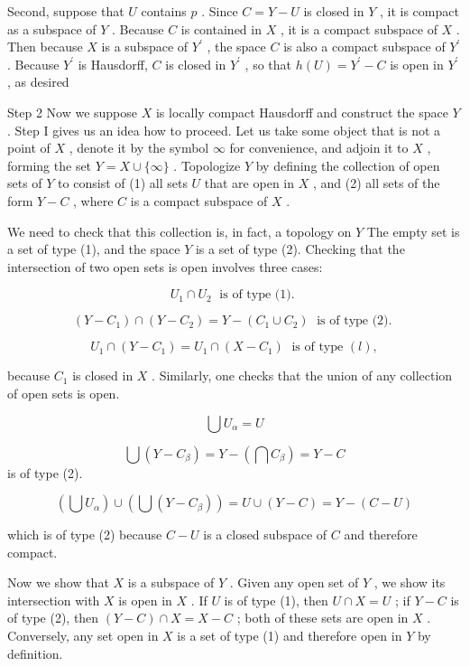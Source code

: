 Second, suppose that \(U\) contains \(p\) . Since \(C = Y - U\) is closed in \(Y\) , it is compact as a subspace of \(Y\) . Because \(C\) is contained in \(X\) , it is a compact subspace of \(X\) . Then because \(X\) is a subspace of \({Y}^{\prime }\) , the space \(C\) is also a compact subspace of \({Y}^{\prime }\) . Because \({Y}^{\prime }\) is Hausdorff, \(C\) is closed in \({Y}^{\prime }\) , so that \(h\left( U\right)  = {Y}^{\prime } - C\) is open in \({Y}^{\prime }\) , as desired

Step 2 Now we suppose \(X\) is locally compact Hausdorff and construct the space \(Y\) . Step I gives us an idea how to proceed. Let us take some object that is not a point of \(X\) , denote it by the symbol \(\infty\) for convenience, and adjoin it to \(X\) , forming the set \(Y = X \cup  \{ \infty \}\) . Topologize \(Y\) by defining the collection of open sets of \(Y\) to consist of (1) all sets \(U\) that are open in \(X\) , and (2) all sets of the form \(Y - C\) , where \(C\) is a compact subspace of \(X\) .

We need to check that this collection is, in fact, a topology on \(Y\) The empty set is a set of type (1), and the space \(Y\) is a set of type (2). Checking that the intersection of two open sets is open involves three cases:

\[
{U}_{1} \cap  {U}_{2}\;\text{ is of type (1). }
\]

\[
\left( {Y - {C}_{1}}\right)  \cap  \left( {Y - {C}_{2}}\right)  = Y - \left( {{C}_{1} \cup  {C}_{2}}\right) \;\text{ is of type (2). }
\]

\[
{U}_{1} \cap  \left( {Y - {C}_{1}}\right)  = {U}_{1} \cap  \left( {X - {C}_{1}}\right) \;\text{ is of type }\left( l\right) ,
\]

because \({C}_{1}\) is closed in \(X\) . Similarly, one checks that the union of any collection of open sets is open.

\[
\bigcup {U}_{\alpha } = U
\]

\[
\bigcup \left( {Y - {C}_{\beta }}\right)  = Y - \left( {\bigcap {C}_{\beta }}\right)  = Y - C
\]
 is of type (2).

\[
\left( {\bigcup {U}_{\alpha }}\right)  \cup  \left( {\bigcup \left( {Y - {C}_{\beta }}\right) }\right)  = U \cup  \left( {Y - C}\right)  = Y - \left( {C - U}\right)
\]

which is of type (2) because \(C - U\) is a closed subspace of \(C\) and therefore compact.

Now we show that \(X\) is a subspace of \(Y\) . Given any open set of \(Y\) , we show its intersection with \(X\) is open in \(X\) . If \(U\) is of type (1), then \(U \cap  X = U\) ; if \(Y - C\) is of type (2), then \(\left( {Y - C}\right)  \cap  X = X - C\) ; both of these sets are open in \(X\) . Conversely, any set open in \(X\) is a set of type (1) and therefore open in \(Y\) by definition.

